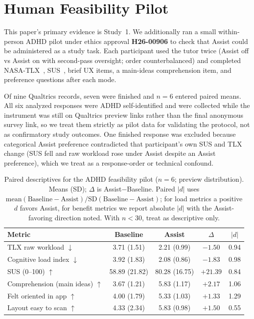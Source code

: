 \section{Human Feasibility Pilot}
\label{sec:feasibility}

This paper's primary evidence is Study~1. We additionally ran a small
within-person ADHD pilot under ethics approval \textbf{H26-00906} to check
that Assist could be administered as a study task. Each participant used the
tutor twice (Assist off vs Assist on with second-pass oversight; order
counterbalanced) and completed NASA-TLX~\cite{hart1988nasa},
SUS~\cite{brooke1996sus}, brief UX items, a main-ideas comprehension item, and
preference questions after each mode.

Of nine Qualtrics records, seven were finished and \textbf{$n{=}6$} entered
paired means. All six analyzed responses were ADHD self-identified and were
collected while the instrument was still on Qualtrics preview links rather than
the final anonymous survey link, so we treat them strictly as pilot data for
validating the protocol, not as confirmatory study outcomes. One finished
response was excluded because categorical Assist preference contradicted that
participant's own SUS and TLX change (SUS fell and raw workload rose under
Assist despite an Assist preference), which we treat as a response-order or
technical confound.

\begin{table}[t]
\caption{Paired descriptives for the ADHD feasibility pilot ($n{=}6$;
preview distribution). Means (SD); $\Delta$ is Assist$-$Baseline.
Paired $|d|$ uses $\mathrm{mean}(\mathrm{Baseline}-\mathrm{Assist})/
\mathrm{SD}(\mathrm{Baseline}-\mathrm{Assist})$; for load metrics a positive
$d$ favors Assist, for benefit metrics we report absolute $|d|$ with the
Assist-favoring direction noted. With $n{<}30$, treat as descriptive only.}
\label{tab:pilot}
\small
\centering
\setlength{\tabcolsep}{3.5pt}
\begin{tabular}{lcccc}
\toprule
Metric & Baseline & Assist & $\Delta$ & $|d|$ \\
\midrule
TLX raw workload $\downarrow$
  & 3.71 (1.51) & 2.21 (0.99) & $-1.50$ & 0.94 \\
Cognitive load index $\downarrow$
  & 3.92 (1.83) & 2.08 (0.86) & $-1.83$ & 0.98 \\
SUS (0--100) $\uparrow$
  & 58.89 (21.82) & 80.28 (16.75) & $+21.39$ & 0.84 \\
Comprehension (main ideas) $\uparrow$
  & 3.67 (1.21) & 5.83 (1.17) & $+2.17$ & 1.06 \\
Felt oriented in app $\uparrow$
  & 4.00 (1.79) & 5.33 (1.03) & $+1.33$ & 1.29 \\
Layout easy to scan $\uparrow$
  & 4.33 (2.34) & 5.83 (0.98) & $+1.50$ & 0.55 \\
\bottomrule
\end{tabular}
\end{table}

